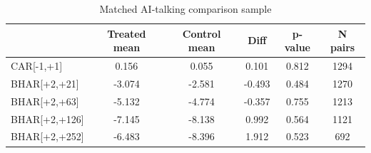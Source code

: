 \begin{table}[!htbp]
\centering
\caption{Matched AI-talking comparison sample}
\begin{tabular}{lccccc}
\hline
 & Treated mean & Control mean & Diff & p-value & N pairs \\
\hline
CAR[-1,+1] & 0.156 & 0.055 & 0.101 & 0.812 & 1294 \\
BHAR[+2,+21] & -3.074 & -2.581 & -0.493 & 0.484 & 1270 \\
BHAR[+2,+63] & -5.132 & -4.774 & -0.357 & 0.755 & 1213 \\
BHAR[+2,+126] & -7.145 & -8.138 & 0.992 & 0.564 & 1121 \\
BHAR[+2,+252] & -6.483 & -8.396 & 1.912 & 0.523 & 692 \\
\hline
\end{tabular}
\end{table}
